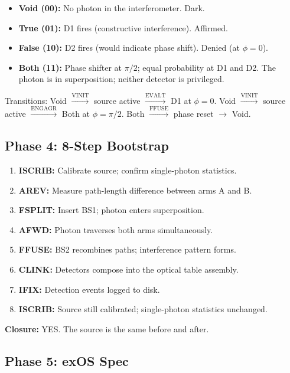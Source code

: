 \documentclass[12pt,a4paper]{article}
\begin{document}
{\small
\begin{itemize}
\item \textbf{Void (00):} No photon in the interferometer. Dark.
\item \textbf{True (01):} D1 fires (constructive interference). Affirmed.
\item \textbf{False (10):} D2 fires (would indicate phase shift). Denied (at $\phi=0$).
\item \textbf{Both (11):} Phase shifter at $\pi/2$; equal probability at D1 and D2.
    The photon is in superposition; neither detector is privileged.
\end{itemize}
}

Transitions: Void $\xrightarrow{\text{VINIT}}$ source active $\xrightarrow{\text{EVALT}}$ D1 at $\phi=0$.
Void $\xrightarrow{\text{VINIT}}$ source active $\xrightarrow{\text{ENGAGR}}$ Both at $\phi=\pi/2$.
Both $\xrightarrow{\text{FFUSE}}$ phase reset $\to$ Void.

\subsection*{Phase 4: 8-Step Bootstrap}

\begin{enumerate}
\item \textbf{ISCRIB:} Calibrate source; confirm single-photon statistics.
\item \textbf{AREV:} Measure path-length difference between arms A and B.
\item \textbf{FSPLIT:} Insert BS1; photon enters superposition.
\item \textbf{AFWD:} Photon traverses both arms simultaneously.
\item \textbf{FFUSE:} BS2 recombines paths; interference pattern forms.
\item \textbf{CLINK:} Detectors compose into the optical table assembly.
\item \textbf{IFIX:} Detection events logged to disk.
\item \textbf{ISCRIB:} Source still calibrated; single-photon statistics unchanged.
\end{enumerate}

\textbf{Closure:} YES. The source is the same before and after.

\subsection*{Phase 5: exOS Spec}
\end{document}
